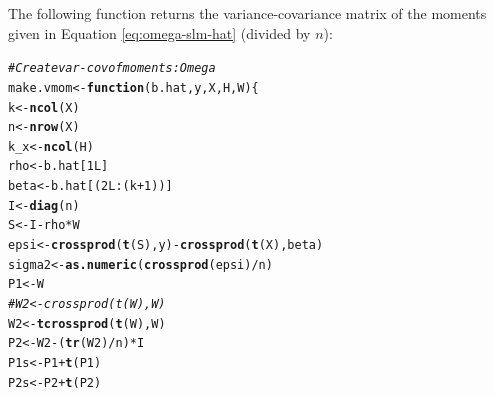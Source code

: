 \documentclass[english,12pt]{book}\usepackage[]{graphicx}\usepackage[]{xcolor}
\makeatletter
\newcommand{\hlnum}[1]{\textcolor[rgb]{0.686,0.059,0.569}{#1}}%
\newcommand{\hlcom}[1]{\textcolor[rgb]{0.678,0.584,0.686}{\textit{#1}}}%
\newcommand{\hlopt}[1]{\textcolor[rgb]{0,0,0}{#1}}%
\newcommand{\hldef}[1]{\textcolor[rgb]{0.345,0.345,0.345}{#1}}%
\newcommand{\hlkwa}[1]{\textcolor[rgb]{0.161,0.373,0.58}{\textbf{#1}}}%
\newcommand{\hlkwb}[1]{\textcolor[rgb]{0.69,0.353,0.396}{#1}}%
\newcommand{\hlkwc}[1]{\textcolor[rgb]{0.333,0.667,0.333}{#1}}%
\newcommand{\hlkwd}[1]{\textcolor[rgb]{0.737,0.353,0.396}{\textbf{#1}}}%
\newenvironment{kframe}{%
 \def\at@end@of@kframe{}%
 \ifinner\ifhmode%
  \def\at@end@of@kframe{\end{minipage}}%
  \begin{minipage}{\columnwidth}%
 \fi\fi%
 \def\FrameCommand##1{\hskip\@totalleftmargin \hskip-\fboxsep
 \colorbox{shadecolor}{##1}\hskip-\fboxsep
     \hskip-\linewidth \hskip-\@totalleftmargin \hskip\columnwidth}%
 \MakeFramed {\advance\hsize-\width
   \@totalleftmargin\z@ \linewidth\hsize
   \@setminipage}}%
 {\par\unskip\endMakeFramed%
 \at@end@of@kframe}
\newenvironment{knitrout}{}{} %
\makeatother
\begin{document}
The following function returns the variance-covariance matrix of the moments given in Equation \eqref{eq:omega-slm-hat} (divided by $n$):
\begin{knitrout}
\color{fgcolor}\begin{kframe}
\begin{alltt}
\hlcom{# Create var-cov of moments: Omega}
\hldef{make.vmom} \hlkwb{<-} \hlkwa{function}\hldef{(}\hlkwc{b.hat}\hldef{,} \hlkwc{y}\hldef{,} \hlkwc{X}\hldef{,} \hlkwc{H}\hldef{,} \hlkwc{W}\hldef{)\{}
  \hldef{k}        \hlkwb{<-} \hlkwd{ncol}\hldef{(X)}
  \hldef{n}        \hlkwb{<-} \hlkwd{nrow}\hldef{(X)}
  \hldef{k_x}      \hlkwb{<-} \hlkwd{ncol}\hldef{(H)}
  \hldef{rho}      \hlkwb{<-} \hldef{b.hat[}\hlnum{1L}\hldef{]}
  \hldef{beta}     \hlkwb{<-} \hldef{b.hat[(}\hlnum{2L}\hlopt{:}\hldef{(k} \hlopt{+} \hlnum{1}\hldef{))]}
  \hldef{I}        \hlkwb{<-} \hlkwd{diag}\hldef{(n)}
  \hldef{S}        \hlkwb{<-} \hldef{I} \hlopt{-}  \hldef{rho} \hlopt{*} \hldef{W}
  \hldef{epsi}     \hlkwb{<-} \hlkwd{crossprod}\hldef{(}\hlkwd{t}\hldef{(S), y)} \hlopt{-} \hlkwd{crossprod}\hldef{(}\hlkwd{t}\hldef{(X), beta)}
  \hldef{sigma2}   \hlkwb{<-} \hlkwd{as.numeric}\hldef{(}\hlkwd{crossprod}\hldef{(epsi)} \hlopt{/} \hldef{n)}
  \hldef{P1}       \hlkwb{<-} \hldef{W}
  \hlcom{#W2       <- crossprod(t(W), W)}
  \hldef{W2}       \hlkwb{<-} \hlkwd{tcrossprod}\hldef{(}\hlkwd{t}\hldef{(W), W)}
  \hldef{P2}       \hlkwb{<-} \hldef{W2} \hlopt{-} \hldef{(}\hlkwd{tr}\hldef{(W2)} \hlopt{/} \hldef{n)} \hlopt{*} \hldef{I}
  \hldef{P1s}      \hlkwb{<-} \hldef{P1} \hlopt{+} \hlkwd{t}\hldef{(P1)}
  \hldef{P2s}      \hlkwb{<-} \hldef{P2} \hlopt{+} \hlkwd{t}\hldef{(P2)}


\end{alltt}
\end{kframe}
\end{knitrout}
\end{document}
